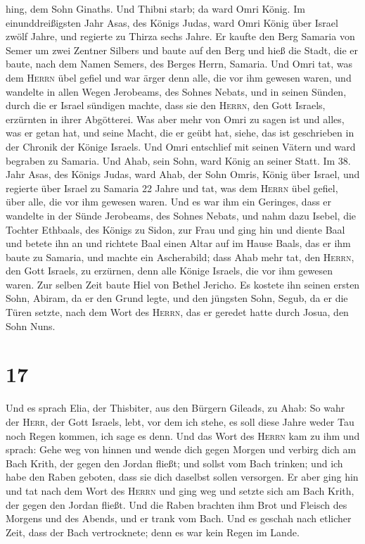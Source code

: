 hing, dem Sohn Ginaths. Und Thibni starb; da ward Omri König.
 Im einunddreißigsten Jahr Asas, des Königs Judas, ward
Omri König über Israel zwölf Jahre, und regierte zu Thirza sechs Jahre.
 Er kaufte den Berg Samaria von Semer um zwei Zentner
Silbers und baute auf den Berg und hieß die Stadt, die er baute, nach
dem Namen Semers, des Berges Herrn, Samaria.  Und Omri
tat, was dem \textsc{Herrn} übel gefiel und war ärger denn alle, die vor
ihm gewesen waren,  und wandelte in allen Wegen
Jerobeams, des Sohnes Nebats, und in seinen Sünden, durch die er Israel
sündigen machte, dass sie den \textsc{Herrn}, den Gott Israels,
erzürnten in ihrer Abgötterei.  Was aber mehr von Omri zu
sagen ist und alles, was er getan hat, und seine Macht, die er geübt
hat, siehe, das ist geschrieben in der Chronik der Könige Israels.
 Und Omri entschlief mit seinen Vätern und ward begraben
zu Samaria. Und Ahab, sein Sohn, ward König an seiner Statt.
 Im 38. Jahr Asas, des Königs Judas, ward Ahab, der Sohn
Omris, König über Israel, und regierte über Israel zu Samaria 22 Jahre
 und tat, was dem \textsc{Herrn} übel gefiel, über alle,
die vor ihm gewesen waren.  Und es war ihm ein Geringes,
dass er wandelte in der Sünde Jerobeams, des Sohnes Nebats, und nahm
dazu Isebel, die Tochter Ethbaals, des Königs zu Sidon, zur Frau und
ging hin und diente Baal und betete ihn an  und richtete
Baal einen Altar auf im Hause Baals, das er ihm baute zu Samaria,
 und machte ein Ascherabild; dass Ahab mehr tat, den
\textsc{Herrn}, den Gott Israels, zu erzürnen, denn alle Könige Israels,
die vor ihm gewesen waren.  Zur selben Zeit baute Hiel
von Bethel Jericho. Es kostete ihn seinen ersten Sohn, Abiram, da er den
Grund legte, und den jüngsten Sohn, Segub, da er die Türen setzte, nach
dem Wort des \textsc{Herrn}, das er geredet hatte durch Josua, den Sohn
Nuns.

\hypertarget{section-16}{%
\section{17}\label{section-16}}

 Und es sprach Elia, der Thisbiter, aus den Bürgern
Gileads, zu Ahab: So wahr der \textsc{Herr}, der Gott Israels, lebt, vor
dem ich stehe, es soll diese Jahre weder Tau noch Regen kommen, ich sage
es denn.  Und das Wort des \textsc{Herrn} kam zu ihm und
sprach:  Gehe weg von hinnen und wende dich gegen Morgen
und verbirg dich am Bach Krith, der gegen den Jordan fließt;
 und sollst vom Bach trinken; und ich habe den Raben
geboten, dass sie dich daselbst sollen versorgen.  Er aber
ging hin und tat nach dem Wort des \textsc{Herrn} und ging weg und
setzte sich am Bach Krith, der gegen den Jordan fließt. 
Und die Raben brachten ihm Brot und Fleisch des Morgens und des Abends,
und er trank vom Bach.  Und es geschah nach etlicher Zeit,
dass der Bach vertrocknete; denn es war kein Regen im Lande.

